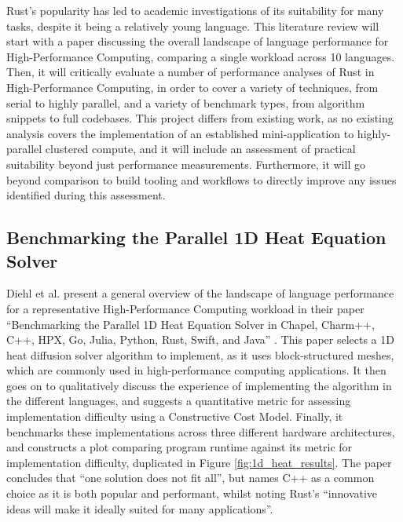 Rust's popularity has led to academic investigations of its suitability for many tasks, despite it being a relatively young language. This literature review will start with a paper discussing the overall landscape of language performance for High-Performance Computing, comparing a single workload across 10 languages. Then, it will critically evaluate a number of performance analyses of Rust in High-Performance Computing, in order to cover a variety of techniques, from serial to highly parallel, and a variety of benchmark types, from algorithm snippets to full codebases. This project differs from existing work, as no existing analysis covers the implementation of an established mini-application to highly-parallel clustered compute, and it will include an assessment of practical suitability beyond just performance measurements. Furthermore, it will go beyond comparison to build tooling and workflows to directly improve any issues identified during this assessment.

\subsection{Benchmarking the Parallel 1D Heat Equation Solver}
\label{ssec:diehl-et-al}

Diehl et al. present a general overview of the landscape of language performance for a representative High-Performance Computing workload in their paper ``Benchmarking the Parallel 1D Heat Equation Solver in Chapel, Charm++, C++, HPX, Go, Julia, Python, Rust, Swift, and Java'' \cite{diehlBenchmarkingParallel1D2023}. This paper selects a 1D heat diffusion solver algorithm to implement, as it uses block-structured meshes, which are commonly used in high-performance computing applications. It then goes on to qualitatively discuss the experience of implementing the algorithm in the different languages, and suggests a quantitative metric for assessing implementation difficulty using a Constructive Cost Model. Finally, it benchmarks these implementations across three different hardware architectures, and constructs a plot comparing program runtime against its metric for implementation difficulty, duplicated in Figure \ref{fig:1d_heat_results}. The paper concludes that ``one solution does not fit all'', but names C++ as a common choice as it is both popular and performant, whilst noting Rust's ``innovative ideas will make it ideally suited for many applications''.

